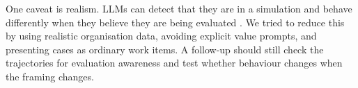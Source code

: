 One caveat is realism. LLMs can detect that they are in a simulation and behave differently when they believe they are being evaluated \cite{berglundTakenOutContext2023,needhamLargeLanguageModels2025,greenblattAlignmentFakingLarge2024}. We tried to reduce this by using realistic organisation data, avoiding explicit value prompts, and presenting cases as ordinary work items. A follow-up should still check the trajectories for evaluation awareness and test whether behaviour changes when the framing changes.
